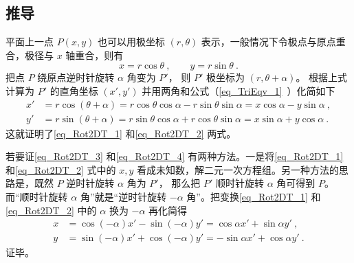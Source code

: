 \subsection{推导}

平面上一点 $P(x,y)$ 也可以用极坐标 $(r, \theta)$ 表示，一般情况下令极点与原点重合，极径与 $x$ 轴重合，则有
\begin{equation}
x = r\cos \theta~, \qquad y = r\sin \theta ~.
\end{equation}     
把点 $P$ 绕原点逆时针旋转 $\alpha $ 角变为 $P'$， 则 $P'$ 极坐标为 $(r, \theta  + \alpha)$。 根据上式计算为 $P'$ 的直角坐标 $(x', y')$ 并用两角和公式（\autoref{eq_TriEqv_1}~）化简如下
\begin{align}
x' &= r\cos(\theta  + \alpha) = r\cos\theta \cos\alpha  - r\sin\theta \sin\alpha  = x\cos\alpha  - y\sin\alpha ~,\\
y' &= r\sin(\theta  + \alpha) = r\sin\theta \cos\alpha  + r\cos\theta \sin\alpha  = x\sin\alpha  + y\cos\alpha ~.
\end{align} 
这就证明了\autoref{eq_Rot2DT_1} 和\autoref{eq_Rot2DT_2} 两式。

若要证\autoref{eq_Rot2DT_3} 和\autoref{eq_Rot2DT_4} 有两种方法。一是将\autoref{eq_Rot2DT_1} 和\autoref{eq_Rot2DT_2} 式中的 $x, y$ 看成未知数，解二元一次方程组。另一种方法的思路是，既然 $P$ 逆时针旋转 $\alpha $ 角为 $P'$， 那么把 $P'$ 顺时针旋转 $\alpha$ 角可得到 $P$。 而“顺时针旋转 $\alpha$ 角”就是“逆时针旋转 $-\alpha $ 角”。把变换\autoref{eq_Rot2DT_1} 和\autoref{eq_Rot2DT_2} 中的 $\alpha$ 换为 $-\alpha$ 再化简得
 \begin{align}
x &= \cos(-\alpha) x' - \sin(-\alpha) y' = \cos\alpha x' + \sin\alpha y'~,\\
y &= \sin(-\alpha) x' + \cos(-\alpha) y' =  -\sin\alpha x' + \cos\alpha y'~.
\end{align}
证毕。
